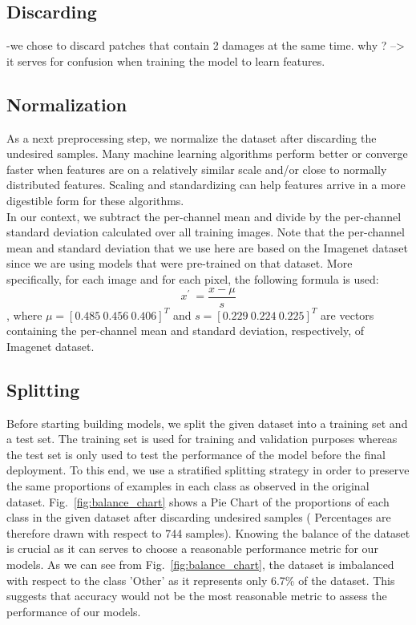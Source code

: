 \documentclass[lang=english,inputenc=utf8,fontsize=10pt]{ldvarticle}
\begin{document}
\subsection*{Discarding }
-we chose to discard patches that contain 2 damages at the same time. why ? --> it serves for confusion when training the model to learn features.

\subsection*{Normalization}
As a next preprocessing step, we normalize the dataset after discarding the undesired samples. Many machine learning algorithms perform better or converge faster when features are on a relatively similar scale and/or close to normally distributed features. Scaling and standardizing can help features arrive in a more digestible form for these algorithms.\\
In our context, we subtract the per-channel mean and divide by the per-channel standard deviation calculated over all training images. Note that the per-channel mean and standard deviation that we use here are based on the Imagenet dataset since we are using models that were pre-trained on that dataset. More specifically, for each image and for each pixel, the following formula is used:
$$x^{'}\ = \frac{x - \mu}{s}$$, where $\mu =[0.485 \: 0.456  \: 0.406]^T$ and $s=[0.229 \: 0.224  \: 0.225]^T$ are vectors containing the per-channel mean and standard deviation, respectively, of Imagenet dataset.

\subsection*{Splitting}
Before starting building models, we split the given dataset into a training set and a test set. The training set is used for training and validation purposes whereas the test set is only used to test the performance of the model before the final deployment. To this end, we use a stratified splitting strategy in order to preserve the same proportions of examples in each class as observed in the original dataset. Fig.~\ref{fig:balance_chart} shows a Pie Chart of the proportions of each class in the given dataset after discarding undesired samples ( Percentages are therefore drawn with respect to 744 samples). Knowing the balance of the dataset is crucial as it can serves to choose a reasonable performance metric for our models. As we can see from Fig.~\ref{fig:balance_chart}, the dataset is imbalanced with respect to the class 'Other' as it represents only 6.7\% of the dataset. This suggests that accuracy would not be the most reasonable metric to assess the performance of our models. 
\end{document}
